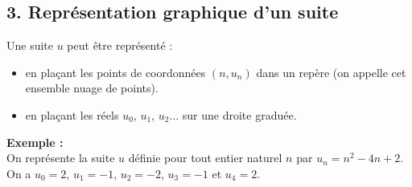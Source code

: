 \documentclass[11pt,a4paper]{article}
\begin{document}
\newpage

\subsection*{3. Représentation graphique d'un suite}


Une suite $u$ peut être représenté :
\vspace{-4pt}
\begin{itemize}
  \item en plaçant les points de coordonnées $(n, u_n)$ dans un repère (on appelle cet ensemble nuage de points).
  \item en plaçant les réels $u_0$, $u_1$, $u_2\dots$ sur une droite graduée.
\end{itemize}


\textbf{Exemple :} ~\\
On représente la suite $u$ définie pour tout entier naturel $n$ par $u_n=n^2-4n+2$.\\
On a  $u_0=2$, $u_1=-1$, $u_2=-2$, $u_3=-1$ et $u_4=2$. \\
\end{document}
